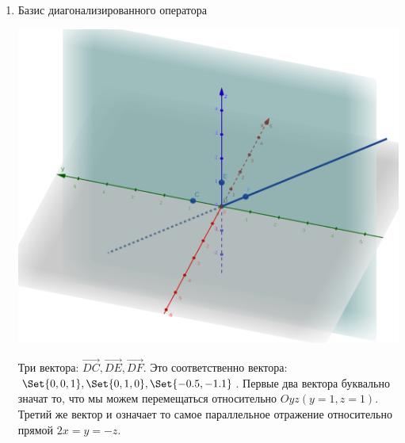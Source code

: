 \begin{enumerate}
\begin{enumerate}
        \item Базис диагонализированного оператора

        \includegraphics[scale=0.2]{images/3a5}

        Три вектора: $\vec{DC}, \vec{DE}, \vec{DF}$.
        Это соответственно вектора: $\Set{0,0,1}, \Set{0,1,0}, \Set{-0.5,-1.1}$. Первые два вектора буквально значат то, что мы можем перемещаться относительно $Oyz (y = 1, z = 1)$. Третий же вектор и означает то самое параллельное отражение относительно прямой $2x=y=-z$.

    \end{enumerate}

\end{enumerate}